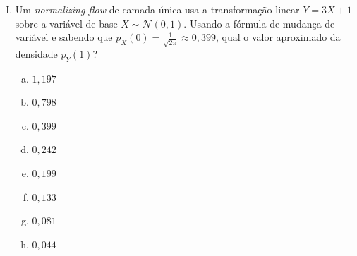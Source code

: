 \documentclass{dlproblemset}
\begin{document}
\begin{enumerate}[I)]
    \textbf{II.} Empilhar várias camadas de \textit{linear flow} $f(\mathbf{x}) = \mathbf{x}\,\mathbf{\Theta}^{\top} + \mathbf{b}$ com matrizes $\mathbf{\Theta}$ distintas aumenta progressivamente a expressividade do modelo, permitindo representar densidades que uma única camada linear não consegue representar.

    \textbf{III.} Por exigirem uma bijeção, \textit{normalizing flows} preservam a dimensão ($\dim \mathbf{z} = \dim \mathbf{x}$), de modo que não há gargalo de compressão como no latente de um VAE.

    \begin{enumerate}[(a)]
        \item Apenas I está correta.
        \item Apenas II está correta.
        \item Apenas III está correta.
        \item Apenas I e II estão corretas.
        \item Apenas I e III estão corretas.
        \item Apenas II e III estão corretas.
        \item Todas estão corretas.
        \item Nenhuma está correta.
    \end{enumerate}

    \item Um \textit{normalizing flow} de camada única usa a transformação linear $Y = 3X + 1$ sobre a variável de base $X \sim \mathcal{N}(0, 1)$. Usando a fórmula de mudança de variável e sabendo que $p_X(0) = \tfrac{1}{\sqrt{2\pi}} \approx 0{,}399$, qual o valor aproximado da densidade $p_Y(1)$?
    \begin{enumerate}[(a)]
        \item $1{,}197$
        \item $0{,}798$
        \item $0{,}399$
        \item $0{,}242$
        \item $0{,}199$
        \item $0{,}133$
        \item $0{,}081$
        \item $0{,}044$
    \end{enumerate}

\end{enumerate}
\end{document}
